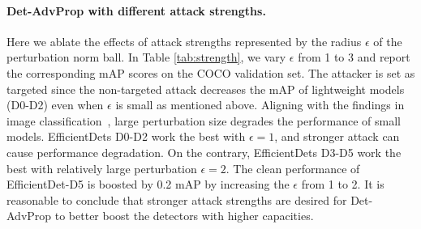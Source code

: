 \documentclass[final]{cvpr}
\begin{document}
\paragraph{Det-AdvProp with different attack strengths.}
Here we ablate the effects of attack strengths represented by the radius $\epsilon$ of the perturbation norm ball.
In Table \ref{tab:strength}, we vary $\epsilon$ from 1 to 3 and report the corresponding mAP scores on the COCO validation set.
The attacker is set as targeted since the non-targeted attack decreases the mAP of lightweight models (D0-D2) even when $\epsilon$ is small as mentioned above.
Aligning with the findings in image classification~\cite{xie2020advprop}, large perturbation size degrades the performance of small models.
EfficientDets D0-D2 work the best with $\epsilon=1$, and stronger attack can cause performance degradation.
On the contrary, EfficientDets D3-D5 work the best with relatively large perturbation $\epsilon=2$.
The clean performance of EfficientDet-D5 is boosted by 0.2 mAP by increasing the $\epsilon$ from 1 to 2.
It is reasonable to conclude that stronger attack strengths are desired for Det-AdvProp to better boost the detectors with higher capacities.

\begin{table}[!htb]
\vspace{-3pt}
\centering
{}
\smallskip
\caption{Impact of attack strengths. All attacks are conducted in the targeted manner. $\epsilon=0$ means vanilla training. Larger attack strengths work better with larger model capacities.}
\vspace{-20pt}
\label{tab:strength}
\end{table}
\end{document}
